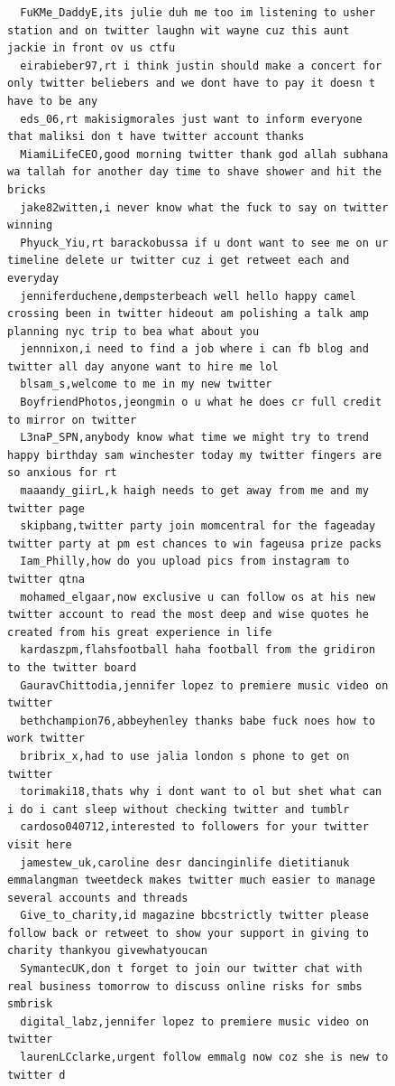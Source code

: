 \begin{figure}[htpb]
\begin{verbatim}
  FuKMe_DaddyE,its julie duh me too im listening to usher station and on twitter laughn wit wayne cuz this aunt jackie in front ov us ctfu
  eirabieber97,rt i think justin should make a concert for only twitter beliebers and we dont have to pay it doesn t have to be any
  eds_06,rt makisigmorales just want to inform everyone that maliksi don t have twitter account thanks
  MiamiLifeCEO,good morning twitter thank god allah subhana wa tallah for another day time to shave shower and hit the bricks
  jake82witten,i never know what the fuck to say on twitter winning
  Phyuck_Yiu,rt barackobussa if u dont want to see me on ur timeline delete ur twitter cuz i get retweet each and everyday
  jenniferduchene,dempsterbeach well hello happy camel crossing been in twitter hideout am polishing a talk amp planning nyc trip to bea what about you
  jennnixon,i need to find a job where i can fb blog and twitter all day anyone want to hire me lol
  blsam_s,welcome to me in my new twitter
  BoyfriendPhotos,jeongmin o u what he does cr full credit to mirror on twitter
  L3naP_SPN,anybody know what time we might try to trend happy birthday sam winchester today my twitter fingers are so anxious for rt
  maaandy_giirL,k haigh needs to get away from me and my twitter page
  skipbang,twitter party join momcentral for the fageaday twitter party at pm est chances to win fageusa prize packs
  Iam_Philly,how do you upload pics from instagram to twitter qtna
  mohamed_elgaar,now exclusive u can follow os at his new twitter account to read the most deep and wise quotes he created from his great experience in life
  kardaszpm,flahsfootball haha football from the gridiron to the twitter board
  GauravChittodia,jennifer lopez to premiere music video on twitter
  bethchampion76,abbeyhenley thanks babe fuck noes how to work twitter
  bribrix_x,had to use jalia london s phone to get on twitter
  torimaki18,thats why i dont want to ol but shet what can i do i cant sleep without checking twitter and tumblr
  cardoso040712,interested to followers for your twitter visit here
  jamestew_uk,caroline desr dancinginlife dietitianuk emmalangman tweetdeck makes twitter much easier to manage several accounts and threads
  Give_to_charity,id magazine bbcstrictly twitter please follow back or retweet to show your support in giving to charity thankyou givewhatyoucan
  SymantecUK,don t forget to join our twitter chat with real business tomorrow to discuss online risks for smbs smbrisk
  digital_labz,jennifer lopez to premiere music video on twitter
  laurenLCclarke,urgent follow emmalg now coz she is new to twitter d

\end{verbatim}
\end{figure}
